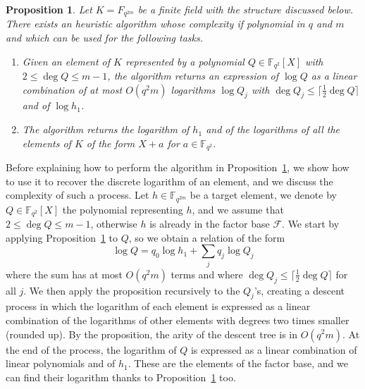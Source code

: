 \documentclass[a4paper,11pt]{article}
\theoremstyle{break}
\newtheorem{prop}[thm]{Proposition}
\theoremstyle{sc}
\theoremstyle{definition}
\theoremstyle{remark}
\begin{document}
\begin{prop}
  \label{prop:bgjt}
  Let $K = F_{q^{2m}}$ be a finite field with the structure discussed below.
  There exists an heuristic algorithm whose complexity if polynomial in $q$ and
  $m$ and which can be used for the following tasks.

  \begin{enumerate}
    \item Given an element of $K$ represented by a polynomial
      $Q\in\mathbb{F}_{q^2}[X]$ with $2\leq \deg Q \leq m-1$, the algorithm
      returns an expression of $\log Q$ as a linear combination of at most
      $O(q^2m)$ logarithms $\log Q_j$ with $\deg Q_j\leq
      \lceil\frac{1}{2}\deg Q\rceil$ and of $\log h_1$.
    \item The algorithm returns the logarithm of $h_1$ and of the logarithms of
      all the elements of $K$ of the form $X+a$ for $a\in\mathbb{F}_{q^2}$.
  \end{enumerate}
\end{prop}

Before explaining how to perform the algorithm in Proposition~\ref{prop:bgjt},
we show how to use it to recover the discrete logarithm of an element, and we
discuss the complexity of such a process. Let $h\in\mathbb{F}_{q^{2m}}$ be a
target element, we denote by $Q\in\mathbb{F}_{q^2}[X]$ the polynomial
representing $h$, and we assume that $2\leq \deg Q\leq m-1$, otherwise $h$ is
already in the factor base $\mathcal F$. We start by applying
Proposition~\ref{prop:bgjt} to $Q$, so we obtain a relation of the form
\[
  \log Q = q_0\log h_1 + \sum_j q_j\log Q_j
\]
where the sum has at most $O(q^2m)$ terms and where $\deg
Q_j\leq\lceil\frac{1}{2}\deg Q\rceil$ for all $j$. We then apply the proposition
recursively to the $Q_j$'s, creating a descent process in which the logarithm of
each element is expressed as a linear combination of the logarithms of other
elements with degrees two times smaller (rounded up). By the proposition, the
arity of the descent tree is in $O(q^2m)$. At the end of the process, the
logarithm of $Q$ is expressed as a linear combination of linear polynomials and
of $h_1$. These are the elements of the factor base, and we can find their
logarithm thanks to Proposition~\ref{prop:bgjt} too.
\end{document}
